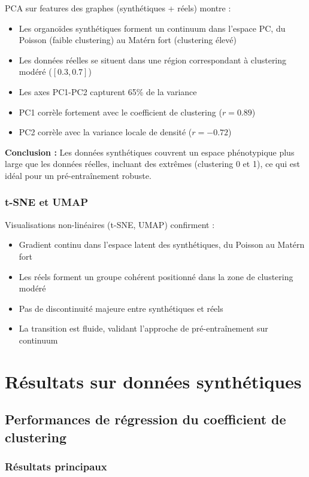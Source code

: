 PCA sur features des graphes (synthétiques + réels) montre :
\begin{itemize}
    \item Les organoïdes synthétiques forment un continuum dans l'espace PC, du Poisson (faible clustering) au Matérn fort (clustering élevé)
    \item Les données réelles se situent dans une région correspondant à clustering modéré ($[0.3, 0.7]$)
    \item Les axes PC1-PC2 capturent 65\% de la variance
    \item PC1 corrèle fortement avec le coefficient de clustering ($r = 0.89$)
    \item PC2 corrèle avec la variance locale de densité ($r = -0.72$)
\end{itemize}

\textbf{Conclusion :}
Les données synthétiques couvrent un espace phénotypique plus large que les données réelles, incluant des extrêmes (clustering 0 et 1), ce qui est idéal pour un pré-entraînement robuste.

\subsubsection{t-SNE et UMAP}

Visualisations non-linéaires (t-SNE, UMAP) confirment :
\begin{itemize}
    \item Gradient continu dans l'espace latent des synthétiques, du Poisson au Matérn fort
    \item Les réels forment un groupe cohérent positionné dans la zone de clustering modéré
    \item Pas de discontinuité majeure entre synthétiques et réels
    \item La transition est fluide, validant l'approche de pré-entraînement sur continuum
\end{itemize}

\section{Résultats sur données synthétiques}

\subsection{Performances de régression du coefficient de clustering}

\subsubsection{Résultats principaux}

